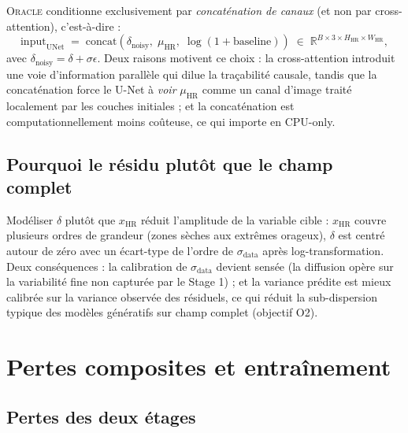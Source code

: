 \documentclass[14pt,a4paper,openany]{extreport}
\theoremstyle{definition}
\newcommand{\Oracle}{\textsc{Oracle}}
\newcommand{\HR}{\ensuremath{\text{HR}}}
\newcommand{\xHR}{\ensuremath{x_{\HR}}}
\newcommand{\muHR}{\ensuremath{\mu_{\HR}}}
\begin{document}
\Oracle{} conditionne exclusivement par \emph{concaténation de canaux} (et non par cross-attention), c'est-à-dire :
\begin{equation}
  \mathrm{input}_{\mathrm{UNet}} \;=\; \mathrm{concat}\!\left( \delta_{\mathrm{noisy}},\; \muHR,\; \log(1 + \mathrm{baseline}) \right) \;\in\; \mathbb{R}^{B \times 3 \times H_{\HR} \times W_{\HR}},
  \label{eq:causal-concat}
\end{equation}
avec $\delta_{\mathrm{noisy}} = \delta + \sigma \epsilon$. Deux raisons motivent ce choix : la cross-attention introduit une voie d'information parallèle qui dilue la traçabilité causale, tandis que la concaténation force le U-Net à \emph{voir} $\muHR$ comme un canal d'image traité localement par les couches initiales ; et la concaténation est computationnellement moins coûteuse, ce qui importe en CPU-only.

\subsection{Pourquoi le résidu plutôt que le champ complet}
\label{ssec:oracle-residu-justif}

Modéliser $\delta$ plutôt que $\xHR$ réduit l'amplitude de la variable cible : $\xHR$ couvre plusieurs ordres de grandeur (zones sèches aux extrêmes orageux), $\delta$ est centré autour de zéro avec un écart-type de l'ordre de $\sigma_{\mathrm{data}}$ après log-transformation. Deux conséquences : la calibration de $\sigma_{\mathrm{data}}$ devient sensée (la diffusion opère sur la variabilité fine non capturée par le Stage 1) ; et la variance prédite est mieux calibrée sur la variance observée des résiduels, ce qui réduit la sub-dispersion typique des modèles génératifs sur champ complet (objectif O2).

\section{Pertes composites et entraînement}
\label{sec:oracle-pertes}

\subsection{Pertes des deux étages}
\label{ssec:oracle-pertes-stage1}
\end{document}

